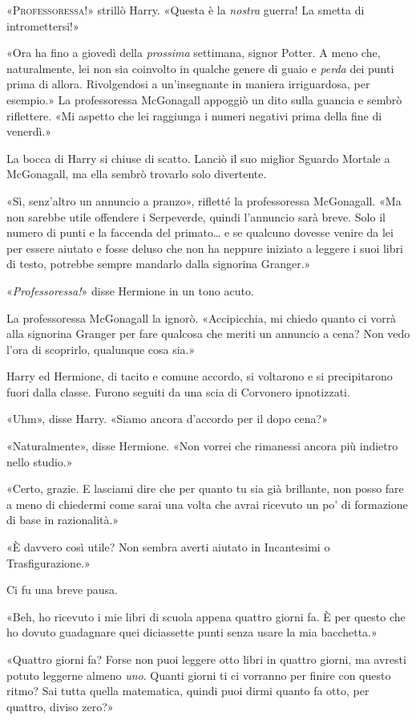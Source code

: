 «\textsc{Professoressa!}» strillò Harry. «Questa è la \textit{nostra} guerra! La smetta di intromettersi!»

«Ora ha fino a giovedì della \textit{prossima} settimana, signor Potter. A meno che, naturalmente, lei non sia coinvolto in qualche genere di guaio e \textit{perda} dei punti prima di allora. Rivolgendosi a un’insegnante in maniera irriguardosa, per esempio.» La professoressa McGonagall appoggiò un dito sulla guancia e sembrò riflettere. «Mi aspetto che lei raggiunga i numeri negativi prima della fine di venerdì.»

La bocca di Harry si chiuse di scatto. Lanciò il suo miglior Sguardo Mortale a McGonagall, ma ella sembrò trovarlo solo divertente.

«Sì, senz’altro un annuncio a pranzo», rifletté la professoressa McGonagall. «Ma non sarebbe utile offendere i Serpeverde, quindi l’annuncio sarà breve. Solo il numero di punti e la faccenda del primato… e se qualcuno dovesse venire da lei per essere aiutato e fosse deluso che non ha neppure iniziato a leggere i suoi libri di testo, potrebbe sempre mandarlo dalla signorina Granger.»

«\textit{Professoressa!}» disse Hermione in un tono acuto.

La professoressa McGonagall la ignorò. «Accipicchia, mi chiedo quanto ci vorrà alla signorina Granger per fare qualcosa che meriti un annuncio a cena? Non vedo l’ora di scoprirlo, qualunque cosa sia.»

Harry ed Hermione, di tacito e comune accordo, si voltarono e si precipitarono fuori dalla classe. Furono seguiti da una scia di Corvonero ipnotizzati.

«Uhm», disse Harry. «Siamo ancora d’accordo per il dopo cena?»

«Naturalmente», disse Hermione. «Non vorrei che rimanessi ancora più indietro nello studio.»

«Certo, grazie. E lasciami dire che per quanto tu sia già brillante, non posso fare a meno di chiedermi come sarai una volta che avrai ricevuto un po’ di formazione di base in razionalità.»

«È davvero così utile? Non sembra averti aiutato in Incantesimi o Trasfigurazione.»

Ci fu una breve pausa.

«Beh, ho ricevuto i mie libri di scuola appena quattro giorni fa. È per questo che ho dovuto guadagnare quei diciassette punti senza usare la mia bacchetta.»

«Quattro giorni fa? Forse non puoi leggere otto libri in quattro giorni, ma avresti potuto leggerne almeno \textit{uno}. Quanti giorni ti ci vorranno per finire con questo ritmo? Sai tutta quella matematica, quindi puoi dirmi quanto fa otto, per quattro, diviso zero?»

